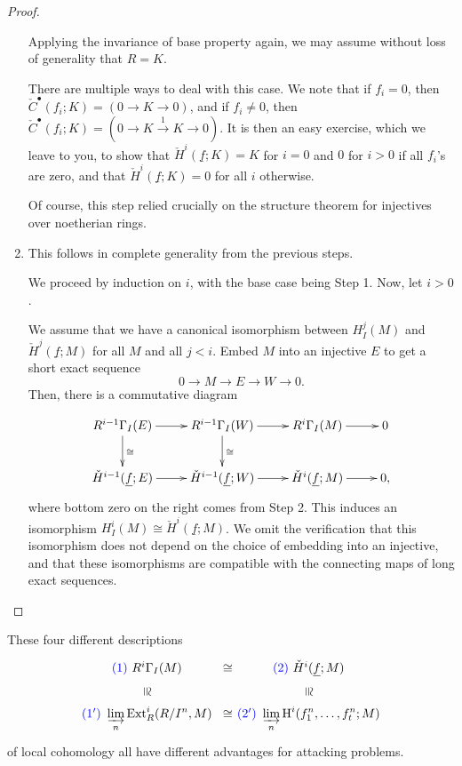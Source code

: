 \documentclass[11pt]{book}
\numberwithin{equation}{section}
\numberwithin{theorem}{chapter}
\theoremstyle{definition}
\newtheorem*{basic properties}{Basic Properties}
\newtheorem*{Important Remark}{Important Remark}
\theoremstyle{remark}
\newcommand{\Ext}{\operatorname{Ext}}
\renewcommand{\H}{\operatorname{H}}
\newcommand{\blue}[1]{\color {blue} #1}
\begin{document}
\begin{proof}
\begin{enumerate}
	 Applying the invariance of base property again, we may assume without loss of generality that $R = K$.
		
		There are multiple ways to deal with this case. We note that if $f_i=0$, then $\check{C}^\bullet(f_i;K)= (0 \to K \to 0)$, and if $f_i\neq 0$, then $\check{C}^\bullet(f_i;K)= (0 \to K \stackrel{1}{\longrightarrow} K \to 0)$. It is then an easy exercise, which we leave to you, to show that $\check{H}^i(\underline{f};K)=K$ for $i=0$ and $0$ for $i>0$ if all $f_i$'s are zero, and that $\check{H}^i(\underline{f};K)=0$ for all $i$ otherwise.
		
		Of course, this step relied crucially on the structure theorem for injectives over noetherian rings.
 
		\item This follows in complete generality from the previous steps.
		
		We proceed by induction on $i$, with the base case being Step 1. Now, let $i>0$.
		
We assume that we have a canonical isomorphism between $H^j_I(M)$ and $\check{H}^j(\underline{f};M)$ for all $M$ and all $j<i$. Embed $M$ into an injective $E$ to get a short exact sequence
\[ 0 \to M \to E \to W \to 0.\]
Then, there is a commutative diagram

$$\xymatrix{R^{i-1}\Gamma_I(E) \ar[r] \ar[d]^{\cong} & R^{i-1}\Gamma_I(W) \ar[r] \ar[d]^{\cong} & R^{i}\Gamma_I(M)\ar[r] & 0 \\ \check{H}^{i-1}(\underline{f};E) \ar[r]  & \check{H}^{i-1}(\underline{f};W) \ar[r]  & \check{H}^{i}(\underline{f};M)\ar[r] & 0 ,}$$ 
where bottom zero on the right comes from Step 2.
This induces an isomorphism $H^{i}_I(M)\cong \check{H}^{i}(\underline{f};M)$. We omit the verification that this isomorphism does not depend on the choice of embedding into an injective, and that these isomorphisms are compatible with the connecting maps of long exact sequences.
	\end{enumerate}	
\end{proof}

These four different descriptions 
$$\xymatrix@R=5mm@C=5mm{{\blue{(1)}} \ R^i\Gamma_I(M)  \ar@{}[r]|*=0[@]{\cong}  \ar@{}[d]|*=0[@]{\cong} & {\blue{(2)}} \ \check{H}^i(\underline{f};M)  \ar@{}[d]|*=0[@]{\cong} \\ 
	{\blue{(1')}} \ \displaystyle\varinjlim_n \Ext^i_R(R/I^n,M)  \ar@{}[r]|*=0[@]{\cong} & {\blue{(2')}} \ \displaystyle\varinjlim_n \H^i (f_1^n, \ldots, f_t^n;M)}$$
of local cohomology all have different advantages for attacking problems. 
\end{document}
